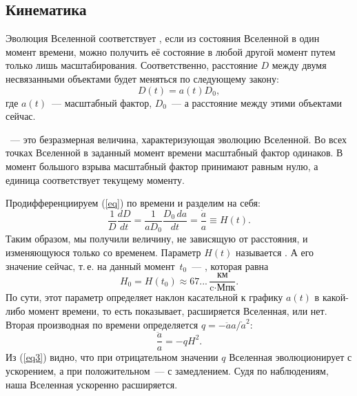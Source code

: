 \subsection{Кинематика}
Эволюция Вселенной соответствует , если из состояния Вселенной в один момент времени, можно получить её состояние в любой другой момент путем только лишь масштабирования. Соответственно, расстояние $D$ между двумя несвязанными объектами будет меняться по следующему закону: 
\begin{equation}
D(t) = a(t)D_0,
\label{eq}
\end{equation}
 где $a(t)$~--- масштабный фактор, $D_0$~--- а расстояние между этими объектами сейчас.

~--- это безразмерная величина, характеризующая эволюцию Вселенной. Во всех точках Вселенной в заданный момент времени масштабный фактор одинаков. В момент большого взрыва масштабный фактор принимают равным нулю, а единица соответствует текущему моменту.

Продифференциируем (\ref{eq}) по времени и разделим на себя:
\begin{equation}
\frac{1}{D} \frac{dD}{dt} = \frac{1}{aD_0} \frac{D_0 \,d a}{dt} = \frac{\dot{a}}{a} \equiv H(t).
\label{eq2}
\end{equation}
Таким образом, мы получили величину, не зависящую от расстояния, и изменяющуюся только со временем. Параметр $H(t)$ называется . А его значение сейчас, т.\,е. на данный момент~$t_0$~--- , которая равна
\begin{equation}
    H_0 = H(t_0) \approx 67...\,\frac{\text{км}}{\text{c} \cdot \text{Мпк}}.
\end{equation} 
По сути, этот параметр определяет наклон касательной к графику $a(t)$ в какой-либо момент времени, то есть показывает, расширяется Вселенная, или нет. Вторая производная  по времени  определяется  $q = -\ddot{a}a \slash \dot{a}^2$:
\begin{equation}
\frac{\ddot{a}}{a} = -qH^2.
\label{eq3}
\end{equation}
Из (\ref{eq3}) видно, что при отрицательном значении $q$ Вселенная эволюционирует с ускорением, а при положительном~--- с замедлением. Судя по наблюдениям, наша Вселенная ускоренно расширяется.


